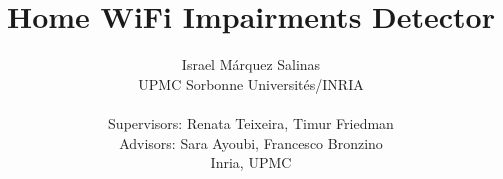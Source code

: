 \documentclass[sigconf]{Template}
\begin{document}
\title{Home WiFi Impairments Detector}
\author{Israel M\'{a}rquez Salinas \\UPMC Sorbonne Universit\'{e}s/INRIA \\\\ { Supervisors: Renata Teixeira, Timur Friedman}\\ {Advisors: Sara Ayoubi, Francesco Bronzino} \\{Inria, UPMC} }

\maketitle










\end{document}

